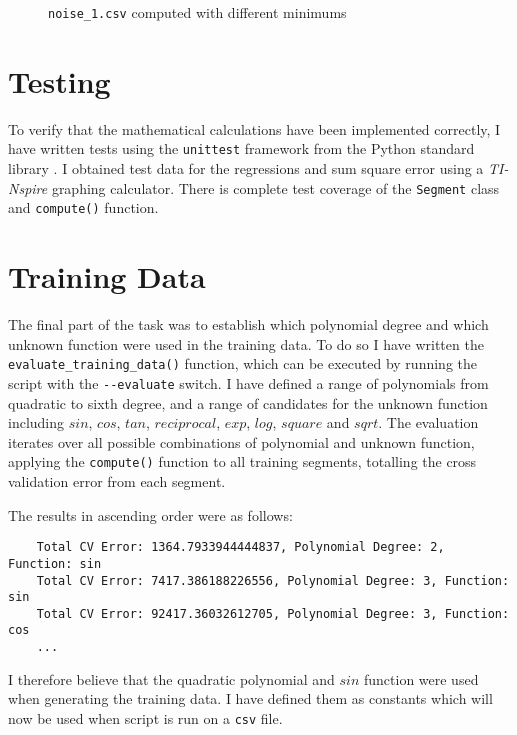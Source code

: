 \documentclass[11pt,a4paper]{scrartcl}
\begin{document}
\begin{figure}
	\centering
	\qquad
	\caption{\lstinline|noise_1.csv| computed with different minimums}
	\label{fig:noise_1}
\end{figure}

\section{Testing}

To verify that the mathematical calculations have been implemented correctly, I have written tests using the \lstinline|unittest| framework from the Python standard library \cite{unittest}. I obtained test data for the regressions and sum square error using a \textit{TI-Nspire} graphing calculator. There is complete test coverage of the \lstinline|Segment| class and \lstinline|compute()| function.


\pagebreak
\section{Training Data}

The final part of the task was to establish which polynomial degree and which unknown function were used in the training data. To do so I have written the \lstinline|evaluate_training_data()| function, which can be executed by running the script with the \lstinline|--evaluate| switch. I have defined a range of polynomials from quadratic to sixth degree, and a range of candidates for the unknown function including $sin$, $cos$, $tan$, $reciprocal$, $exp$, $log$, $square$ and $sqrt$. The evaluation iterates over all possible combinations of polynomial and unknown function, applying the \lstinline|compute()| function to all training segments, totalling the cross validation error from each segment.

The results in ascending order were as follows:

\begin{lstlisting}
	Total CV Error: 1364.7933944444837, Polynomial Degree: 2, Function: sin
	Total CV Error: 7417.386188226556, Polynomial Degree: 3, Function: sin
	Total CV Error: 92417.36032612705, Polynomial Degree: 3, Function: cos
	...
\end{lstlisting}

I therefore believe that the quadratic polynomial and $sin$ function were used when generating the training data. I have defined them as constants which will now be used when script is run on a \lstinline|csv| file.


\printbibliography
\end{document}
